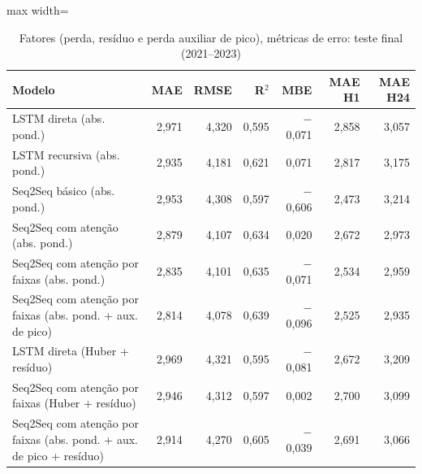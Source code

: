 \begin{table}[!htbp]
    \centering
    \caption{Fatores (perda, resíduo e perda auxiliar de pico), métricas de erro: teste final (2021--2023)}
    \label{tab:metricas_fatores_holdout}
    \small
    \begin{adjustbox}{max width=\textwidth}
    \begin{tabular}{>{\raggedright\arraybackslash}p{}rrrrrr}
        \toprule
        Modelo & MAE & RMSE & R$^2$ & MBE & MAE H1 & MAE H24 \\
        \midrule
        LSTM direta (abs. pond.) & 2,971 & 4,320 & 0,595 & $-$0,071 & 2,858 & 3,057 \\
        LSTM recursiva (abs. pond.) & 2,935 & 4,181 & 0,621 & 0,071 & 2,817 & 3,175 \\
        Seq2Seq básico (abs. pond.) & 2,953 & 4,308 & 0,597 & $-$0,606 & 2,473 & 3,214 \\
        Seq2Seq com atenção (abs. pond.) & 2,879 & 4,107 & 0,634 & 0,020 & 2,672 & 2,973 \\
        Seq2Seq com atenção por faixas (abs. pond.) & 2,835 & 4,101 & 0,635 & $-$0,071 & 2,534 & 2,959 \\
        Seq2Seq com atenção por faixas (abs. pond. + aux. de pico) & 2,814 & 4,078 & 0,639 & $-$0,096 & 2,525 & 2,935 \\
        LSTM direta (Huber + resíduo) & 2,969 & 4,321 & 0,595 & $-$0,081 & 2,672 & 3,209 \\
        Seq2Seq com atenção por faixas (Huber + resíduo) & 2,946 & 4,312 & 0,597 & 0,002 & 2,700 & 3,099 \\
        Seq2Seq com atenção por faixas (abs. pond. + aux. de pico + resíduo) & 2,914 & 4,270 & 0,605 & $-$0,039 & 2,691 & 3,066 \\
        \bottomrule
    \end{tabular}
    \end{adjustbox}
\end{table}
